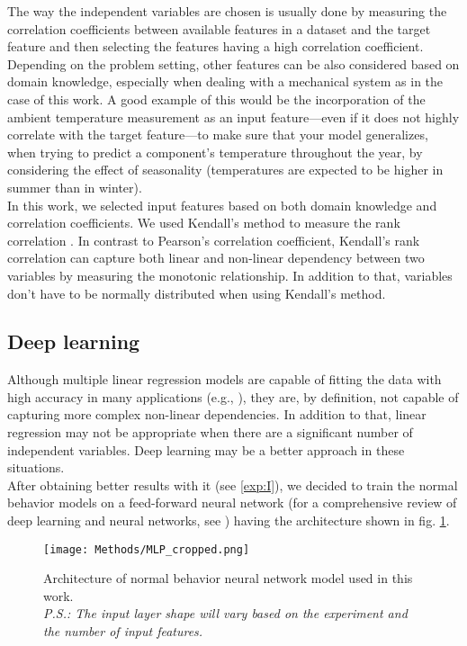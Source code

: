   \par The way the independent variables are chosen is usually done by measuring the correlation coefficients between available features in a
  dataset and the target feature and then selecting the features having a high correlation coefficient. Depending on the problem setting, other features can be also considered 
  based on domain knowledge, especially when dealing with a mechanical system as in the case of this work. A good example of this would be the incorporation of 
  the ambient temperature measurement as an input feature---even if it does not highly correlate with the target feature---to make sure that your model generalizes, when 
  trying to predict a component's temperature throughout the year, by considering the effect of seasonality 
  (temperatures are expected to be higher in summer than in winter).\\
  In this work, we selected input features based on both domain knowledge and correlation coefficients. We used Kendall's method to measure the rank correlation \cite{Kendall}.
  In contrast to Pearson's correlation coefficient, Kendall's rank correlation can capture both linear and non-linear dependency between two variables by 
  measuring the monotonic relationship. In addition to that, variables don't have to be normally distributed when using Kendall's method.

\subsection{Deep learning}
  Although multiple linear regression models are capable of fitting the data with high accuracy in many applications (e.g., \cite{Linear_Regression_Example_1}), they are,
  by definition, not capable of capturing more complex non-linear dependencies. In addition to that, linear regression may not be appropriate when there are a significant 
  number of independent variables. Deep learning may be a better approach in these situations.\\
  After obtaining better results with it (see \ref{exp:I}), we decided to train the normal behavior models
  on a feed-forward neural network (for a comprehensive review of deep learning and neural networks, see \cite{Deep_Learning}) having the architecture shown 
  in fig. \ref{fig:MLP}.

  \begin{figure}[!htbp]
    \begin{center}
      \texttt{[image: Methods/MLP\_cropped.png]}
    \end{center}
    \caption{Architecture of normal behavior neural network model used in this work. \\
    \emph{P.S.: The input layer shape will vary based on the experiment and the number of input features.}}
    \label{fig:MLP}
  \end{figure}
  
